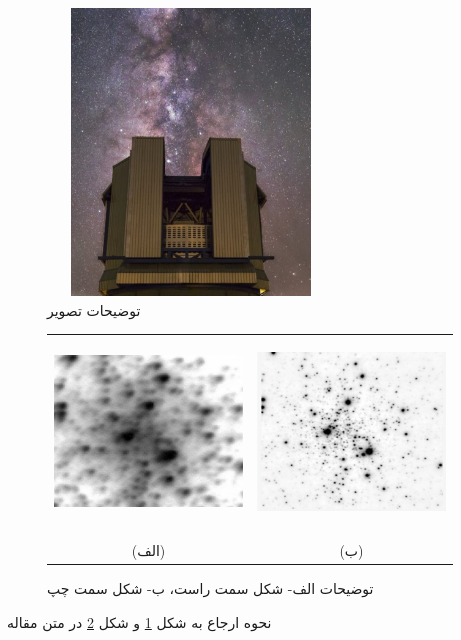 \documentclass[twoside]{article}
\newcommand{\عنوان}{عنوان ارائه}
\newcommand{\نام}{نام و نام خانوادگی}
\newcommand{\رشته}{رشته}
\newcommand{\دانشگاه}{دانشگاه}
\newcommand{\همکار}{نام و نام خانوادگی همکار}
\begin{document}
\begin{figure}
\centering
\includegraphics[width=7.62cm,height=7.62cm]{Fig1}
\caption{توضیحات تصویر \label{fig1}}
\end{figure}
\begin{figure}
\centering
\begin{tabular}{cc}
\includegraphics[width=5cm,height=5cm]{Fig2}&
\includegraphics[width=5cm,height=5cm]{Fig3}\\\\
(الف) & (ب) \\
\end{tabular}
\caption{توضیحات الف- شکل سمت راست، ب- شکل سمت چپ  \label{fig2}}
\end{figure}
نحوه ارجاع به شکل \ref{fig1} و شکل \ref{fig2} در متن مقاله
\end{document}
